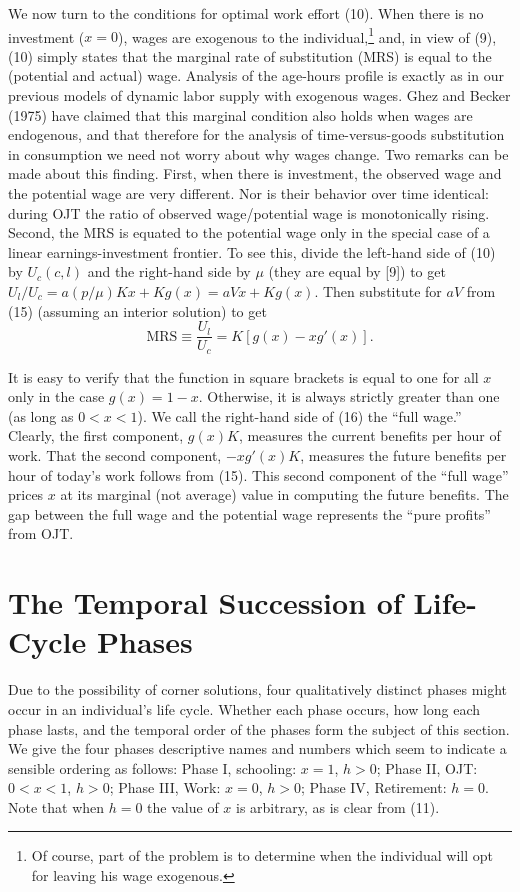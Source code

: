 \documentclass[11pt,fleqn]{article}
\begin{document}
We now turn to the conditions for optimal work effort (10). When there is no investment ($x = 0$), wages are exogenous to the individual,\footnote{Of course, part of the problem is to determine when the individual will opt for leaving his wage exogenous.} and, in view of (9), (10) simply states that the marginal rate of substitution (MRS) is equal to the (potential and actual) wage. Analysis of the age-hours profile is exactly as in our previous models of dynamic labor supply with exogenous wages. Ghez and Becker (1975) have claimed that this marginal condition also holds when wages are endogenous, and that therefore for the analysis of time-versus-goods substitution in consumption we need not worry about why wages change. Two remarks can be made about this finding. First, when there is investment, the observed wage and the potential wage are very different. Nor is their behavior over time identical: during OJT the ratio of observed wage/potential wage is monotonically rising. Second, the MRS is equated to the potential wage only in the special case of a linear earnings-investment frontier. To see this, divide the left-hand side of (10) by $U_c(c, l)$ and the right-hand side by $\mu$ (they are equal by [9]) to get $U_l/U_c = a (p/\mu) Kx + Kg(x) = aVx + Kg(x)$. Then substitute for $aV$ from (15) (assuming an interior solution) to get
\begin{equation}
\text{MRS} \equiv \frac{U_l}{U_c} = K[g(x) - x g'(x)].
\end{equation}

It is easy to verify that the function in square brackets is equal to one for all $x$ only in the case $g(x) = 1 - x$. Otherwise, it is always strictly greater than one (as long as $0 < x < 1$). We call the right-hand side of (16) the ``full wage.'' Clearly, the first component, $g(x)K$, measures the current benefits per hour of work. That the second component, $-xg'(x)K$, measures the future benefits per hour of today's work follows from (15). This second component of the ``full wage'' prices $x$ at its marginal (not average) value in computing the future benefits. The gap between the full wage and the potential wage represents the ``pure profits'' from OJT.

\section{The Temporal Succession of Life-Cycle Phases}

Due to the possibility of corner solutions, four qualitatively distinct phases might occur in an individual's life cycle. Whether each phase occurs, how long each phase lasts, and the temporal order of the phases form the subject of this section. We give the four phases descriptive names and numbers which seem to indicate a sensible ordering as follows: Phase I, schooling: $x = 1$, $h > 0$; Phase II, OJT: $0 < x < 1$, $h > 0$; Phase III, Work: $x = 0$, $h > 0$; Phase IV, Retirement: $h = 0$. Note that when $h = 0$ the value of $x$ is arbitrary, as is clear from (11).
\end{document}
